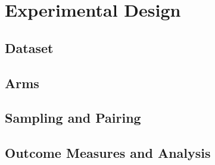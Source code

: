 \chapter{Experimental Design}
\label{ch:experiments}

\section{Dataset}
\label{sec:exp-dataset}

\section{Arms}
\label{sec:exp-arms}

\section{Sampling and Pairing}
\label{sec:exp-sampling}

\section{Outcome Measures and Analysis}
\label{sec:exp-metrics}

